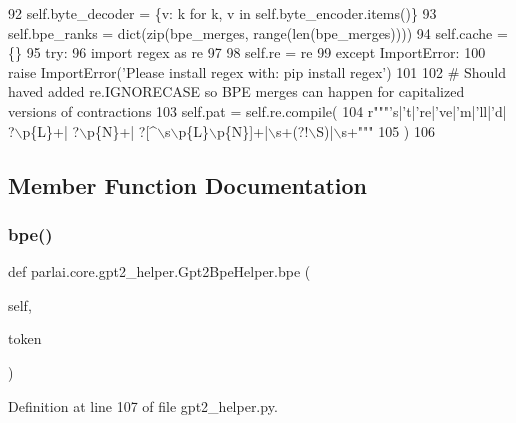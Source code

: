 \begin{DoxyCode}
92         self.byte\_decoder = \{v: k \textcolor{keywordflow}{for} k, v \textcolor{keywordflow}{in} self.byte\_encoder.items()\}
93         self.bpe\_ranks = dict(zip(bpe\_merges, range(len(bpe\_merges))))
94         self.cache = \{\}
95         \textcolor{keywordflow}{try}:
96             \textcolor{keyword}{import} regex \textcolor{keyword}{as} re
97 
98             self.re = re
99         \textcolor{keywordflow}{except} ImportError:
100             \textcolor{keywordflow}{raise} ImportError(\textcolor{stringliteral}{'Please install regex with: pip install regex'})
101 
102         \textcolor{comment}{# Should haved added re.IGNORECASE so BPE merges can happen for capitalized versions of
       contractions}
103         self.pat = self.re.compile(
104             \textcolor{stringliteral}{r"""'s|'t|'re|'ve|'m|'ll|'d| ?\(\backslash\)p\{L\}+| ?\(\backslash\)p\{N\}+| ?[^\(\backslash\)s\(\backslash\)p\{L\}\(\backslash\)p\{N\}]+|\(\backslash\)s+(?!\(\backslash\)S)|\(\backslash\)s+"""}
105         )
106 
\end{DoxyCode}


\subsection{Member Function Documentation}
\mbox{\label{classparlai_1_1core_1_1gpt2__helper_1_1Gpt2BpeHelper_ac2bbb343b37bc277bf717b87ed675ff9}} 
\subsubsection{\texorpdfstring{bpe()}{bpe()}}
{\footnotesize\ttfamily def parlai.\+core.\+gpt2\+\_\+helper.\+Gpt2\+Bpe\+Helper.\+bpe (\begin{DoxyParamCaption}\item[{}]{self,  }\item[{}]{token }\end{DoxyParamCaption})}



Definition at line 107 of file gpt2\+\_\+helper.\+py.


